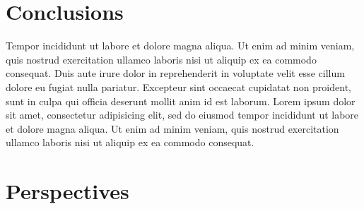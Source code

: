 \documentclass[a0, portrait]{a0poster}
\begin{document}
\begin{multicols}{3}
\begin{center}\vspace{1cm}
\end{center}\vspace{1cm}

\begin{center}\vspace{1cm}
\end{center}

\color{SaddleBrown} %

\section*{Conclusions}

Tempor incididunt ut labore et dolore magna aliqua. Ut enim ad minim veniam,
quis nostrud exercitation ullamco laboris nisi ut aliquip ex ea commodo
consequat. Duis aute irure dolor in reprehenderit in voluptate velit esse
cillum dolore eu fugiat nulla pariatur. Excepteur sint occaecat cupidatat non
proident, sunt in culpa qui officia deserunt mollit anim id est laborum. Lorem ipsum dolor sit amet, consectetur adipisicing elit, sed do eiusmod
tempor incididunt ut labore et dolore magna aliqua. Ut enim ad minim veniam,
quis nostrud exercitation ullamco laboris nisi ut aliquip ex ea commodo
consequat.

\color{Black} %


\section*{Perspectives}


\end{multicols}
\end{document}
